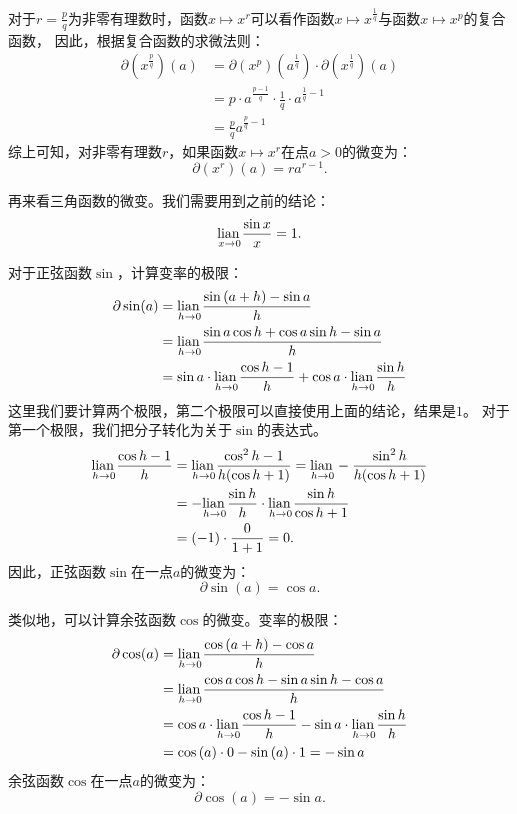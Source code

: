 \documentclass[12pt,UTF8]{ctexbook}
\begin{document}
对于$r = \frac{p}{q}$为非零有理数时，函数$x \mapsto x^r$可以看作函数$x \mapsto x^{\frac{1}{q}}$与函数$x \mapsto x^{p}$的复合函数，
因此，根据复合函数的求微法则：
\begin{align*}
    \partial (x^{\frac{p}{q}}) (a) &= \partial (x^p) (a^{\frac{1}{q}}) \cdot \partial (x^{\frac{1}{q}}) (a)  \\
    &= p \cdot a^{\frac{p - 1}{q}} \cdot \frac{1}{q} \cdot a^{\frac{1}{q} - 1}  \\
    &= \frac{p}{q} a^{\frac{p}{q} - 1}     
\end{align*}
综上可知，对非零有理数$r$，如果函数$x \mapsto x^r$在点$a>0$的微变为：
$$ \partial (x^r) (a) = r a^{r-1}. $$

再来看三角函数的微变。我们需要用到之前的结论：
$$ \underset{x\to 0}{\operatorname{lian}\,} \frac{\sin{x}}{x} = 1.$$

对于正弦函数$\sin$，计算变率的极限：
\begin{align*}
    \partial \sin(a) &= \underset{h\to 0}{\operatorname{lian}\,} \frac{\sin{(a + h)} - \sin{a}}{h}  \\
    &= \underset{h\to 0}{\operatorname{lian}\,} \frac{\sin{a}\cos{h} + \cos{a}\sin{h} - \sin{a}}{h}  \\
    &= \sin{a} \cdot \underset{h\to 0}{\operatorname{lian}\,} \frac{\cos{h} - 1}{h} + \cos{a} \cdot \underset{h\to 0}{\operatorname{lian}\,}\frac{\sin{h}}{h} 
\end{align*}
这里我们要计算两个极限，第二个极限可以直接使用上面的结论，结果是$1$。
对于第一个极限，我们把分子转化为关于$\sin$的表达式。
\begin{align*}
    \underset{h\to 0}{\operatorname{lian}\,} \frac{\cos{h} - 1}{h} &= \underset{h\to 0}{\operatorname{lian}\,} \frac{\cos^2{h} - 1}{h(\cos{h} + 1)} = \underset{h\to 0}{\operatorname{lian}\,} -\frac{\sin^2{h}}{h(\cos{h} + 1)}  \\
    &= -\underset{h\to 0}{\operatorname{lian}\,} \frac{\sin{h}}{h} \cdot \underset{h\to 0}{\operatorname{lian}\,} \frac{\sin{h}}{\cos{h} + 1}  \\
    &= (-1) \cdot \frac{0}{1 + 1} = 0.  
\end{align*}
因此，正弦函数$\sin$在一点$a$的微变为：
$$ \partial \sin(a) = \cos{a}. $$

类似地，可以计算余弦函数$\cos$的微变。变率的极限：
\begin{align*}
    \partial \cos(a) &= \underset{h\to 0}{\operatorname{lian}\,} \frac{\cos{(a + h)} - \cos{a}}{h}  \\
    &= \underset{h\to 0}{\operatorname{lian}\,} \frac{\cos{a}\cos{h} - \sin{a}\sin{h} - \cos{a}}{h}  \\
    &= \cos{a} \cdot \underset{h\to 0}{\operatorname{lian}\,} \frac{\cos{h} - 1}{h} - \sin{a} \cdot\underset{h\to 0}{\operatorname{lian}\,}\frac{\sin{h}}{h}  \\
    &= \cos{(a)} \cdot 0 - \sin{(a)} \cdot 1 = -\sin{a} 
\end{align*}
余弦函数$\cos$在一点$a$的微变为：
$$ \partial \cos(a) = -\sin{a}. $$
\end{document}
